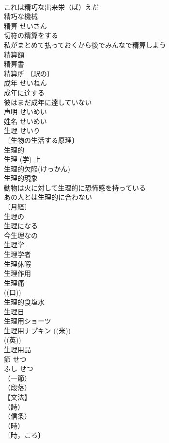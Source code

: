 \documentclass[8pt]{extreport}
\begin{document}
\begin{CJK}{UTF8}{min}
\\	これは精巧な出来栄（ば）えだ 
\\	精巧な機械 
\\	精算	せいさん	
\\	切符の精算をする 
\\	私がまとめて払っておくから後でみんなで精算しよう 
\\	精算額 
\\	精算書 
\\	精算所 〔駅の〕
\\	成年	せいねん	
\\	成年に達する 
\\	彼はまだ成年に達していない 
\\	声明	せいめい	
\\	姓名	せいめい	
\\	生理	せいり	
\\	〔生物の生活する原理〕
\\	生理的 
\\	生理 (学) 上 
\\	生理的欠陥(けっかん) 
\\	生理的現象 
\\	動物は火に対して生理的に恐怖感を持っている 
\\	あの人とは生理的に合わない 
\\	〔月経〕
\\	生理の 
\\	生理になる 
\\	今生理なの 
\\	生理学 
\\	生理学者 
\\	生理休暇 
\\	生理作用 
\\	生理痛 
\\	((口))
\\	生理的食塩水 
\\	生理日 
\\	生理用ショーツ 
\\	生理用ナプキン ((米))
\\	((英)) 
\\	生理用品 
\\	節	せつ　
\\	ふし	せつ 
\\	（一節）
\\	（段落）
\\	【文法】
\\	（詩）
\\	（信条）
\\	（時）
\\	〔時，ころ〕

\end{CJK}
\end{document}
